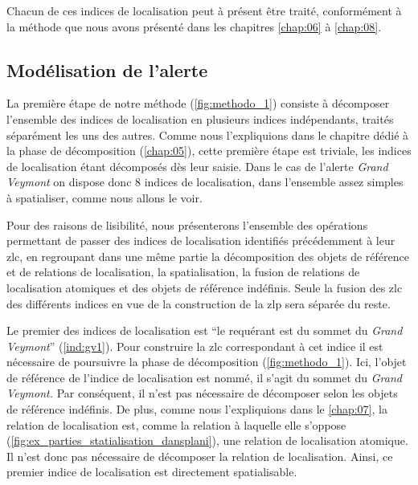 Chacun de ces indices de localisation peut à présent être traité,
conformément à la méthode que nous avons présenté dans les chapitres
\ref{chap:06} à \ref{chap:08}.

\subsection{Modélisation de l'alerte}
\label{subsec:9-2-2}

La première étape de notre méthode (\autoref{fig:methodo_1}) consiste
à décomposer l'ensemble des indices de localisation en plusieurs
indices indépendants, traités séparément les uns des autres. Comme
nous l'expliquions dans le chapitre dédié à la phase de décomposition
(\autoref{chap:05}), cette première étape est triviale, les indices de
localisation étant décomposés dès leur saisie. Dans le cas de l'alerte
\emph{Grand Veymont} on dispose donc 8 indices de localisation, dans
l'ensemble assez simples à spatialiser, comme nous allons le voir.

Pour des raisons de lisibilité, nous présenterons l'ensemble des
opérations permettant de passer des indices de localisation identifiés
précédemment à leur \ac{zlc}, en regroupant dans une même partie la
décomposition des objets de référence et de relations de localisation,
la spatialisation, la fusion de relations de localisation atomiques et
des objets de référence indéfinis. Seule la fusion des \ac{zlc} des
différents indices en vue de la construction de la \ac{zlp} sera
séparée du reste.

Le premier des indices de localisation est \enquote{le requérant est
   du sommet du \emph{Grand
    Veymont}} (\ref{ind:gv1}). Pour construire la \ac{zlc}
correspondant à cet indice il est nécessaire de poursuivre la phase de
décomposition (\autoref{fig:methodo_1}). Ici, l'objet de référence de
l'indice de localisation est nommé, il s'agit du sommet du \emph{Grand
  Veymont.} Par conséquent, il n'est pas nécessaire de décomposer
selon les objets de référence indéfinis. De plus, comme nous
l'expliquions dans le \autoref{chap:07}, la relation de localisation
 est, comme la relation
 à laquelle elle s'oppose
(\autoref{fig:ex_parties_statialisation_dansplani}), une relation de
localisation atomique. Il n'est donc pas nécessaire de décomposer la
relation de localisation. Ainsi, ce premier indice de localisation est
directement spatialisable.

